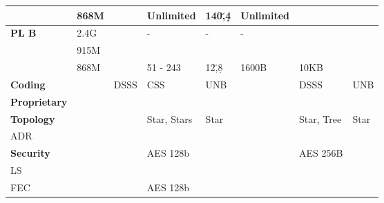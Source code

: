 \begin{longtable}{l|l|l|l|l|l|l|l}
	\                                    & 868M             & \ko          & Unlimited              & 140\u,4\d     & Unlimited                              & \ko               & \ko             \\\hline
	\bf{\ac{PL}	B}                       & 2.4G             & \ko          & -                      & -             & -                                      & \ko               & \ko             \\
	\                                    & 915M             & \ko          & \ko                    & \ko           & \ko                                    & \ko               & \ko             \\
	\                                    & 868M             & \ko          & 51 - 243               & 12\u,8\d      & 1600B                                  & 10KB              & \ko             \\\hline
	\bf{Coding}                          &                  & \ac{DSSS}    & \ac{CSS}               & \ac{UNB}      & \ko                                    & \ac{DSSS}         & \ac{UNB}        \\\hline
	\bf{Proprietary}                     &                  & \ko          & \ko                    & \ok           & \ko                                    & \ko               & \ko             \\\hline
	\bf{Topology}                        & \                & \ko          & Star, Stars            & Star          & \ko                                    & Star, Tree        & Star            \\\hline
	\ac{ADR}                             & \                & \ko          & \ok                    & \ko           & \ko                                    & \ok               & \ko             \\\hline
	\bf{Security}                        & \                & \ko          & AES 128b               & \ko           & \ko                                    & AES 256B & \ko             \\\hline
	\ac{LS}                              & \                & \ko          & \ok                    & \ko           & \ko                                    & \ko               & \ko             \\\hline
	\ac{FEC}                             & \                & \ko          & AES 128b               & \ko           & \ko                                    & \ok               & \ko             \\\hline

\end{longtable}
